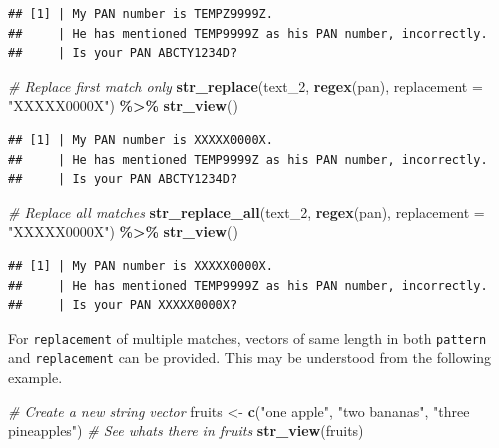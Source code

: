 \documentclass[
]{book}
\newenvironment{Shaded}{\begin{snugshade}}{\end{snugshade}}
\newcommand{\AttributeTok}[1]{\textcolor[rgb]{0.13,0.29,0.53}{#1}}
\newcommand{\CommentTok}[1]{\textcolor[rgb]{0.56,0.35,0.01}{\textit{#1}}}
\newcommand{\FunctionTok}[1]{\textcolor[rgb]{0.13,0.29,0.53}{\textbf{#1}}}
\newcommand{\NormalTok}[1]{#1}
\newcommand{\OtherTok}[1]{\textcolor[rgb]{0.56,0.35,0.01}{#1}}
\newcommand{\SpecialCharTok}[1]{\textcolor[rgb]{0.81,0.36,0.00}{\textbf{#1}}}
\newcommand{\StringTok}[1]{\textcolor[rgb]{0.31,0.60,0.02}{#1}}
\begin{document}
\begin{verbatim}
## [1] | My PAN number is TEMPZ9999Z.
##     | He has mentioned TEMP9999Z as his PAN number, incorrectly.
##     | Is your PAN ABCTY1234D?
\end{verbatim}

\begin{Shaded}
\begin{Highlighting}[]
\CommentTok{\# Replace first match only}
\FunctionTok{str\_replace}\NormalTok{(text\_2, }\FunctionTok{regex}\NormalTok{(pan), }\AttributeTok{replacement =} \StringTok{"XXXXX0000X"}\NormalTok{) }\SpecialCharTok{\%\textgreater{}\%} 
  \FunctionTok{str\_view}\NormalTok{()}
\end{Highlighting}
\end{Shaded}

\begin{verbatim}
## [1] | My PAN number is XXXXX0000X.
##     | He has mentioned TEMP9999Z as his PAN number, incorrectly.
##     | Is your PAN ABCTY1234D?
\end{verbatim}

\begin{Shaded}
\begin{Highlighting}[]
\CommentTok{\# Replace all matches}
\FunctionTok{str\_replace\_all}\NormalTok{(text\_2, }\FunctionTok{regex}\NormalTok{(pan), }\AttributeTok{replacement =} \StringTok{"XXXXX0000X"}\NormalTok{) }\SpecialCharTok{\%\textgreater{}\%} 
  \FunctionTok{str\_view}\NormalTok{()}
\end{Highlighting}
\end{Shaded}

\begin{verbatim}
## [1] | My PAN number is XXXXX0000X.
##     | He has mentioned TEMP9999Z as his PAN number, incorrectly.
##     | Is your PAN XXXXX0000X?
\end{verbatim}

For \texttt{replacement} of multiple matches, vectors of same length in both \texttt{pattern} and \texttt{replacement} can be provided. This may be understood from the following example.

\begin{Shaded}
\begin{Highlighting}[]
\CommentTok{\# Create a new string vector}
\NormalTok{fruits }\OtherTok{\textless{}{-}} \FunctionTok{c}\NormalTok{(}\StringTok{"one apple"}\NormalTok{,}
            \StringTok{"two bananas"}\NormalTok{,}
            \StringTok{"three pineapples"}\NormalTok{)}
\CommentTok{\# See what\textquotesingle{}s there in \textasciigrave{}fruits\textasciigrave{}}
\FunctionTok{str\_view}\NormalTok{(fruits)}
\end{Highlighting}
\end{Shaded}
\end{document}
